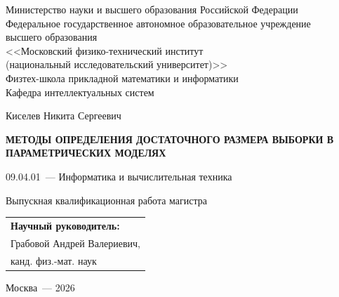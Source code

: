 \thispagestyle{empty}

\begin{titlepage}

\begin{center}
Министерство науки и высшего образования Российской Федерации\\
Федеральное государственное автономное образовательное учреждение\\ высшего образования\\
<<Московский физико-технический институт\\
(национальный исследовательский университет)>>\\
Физтех-школа прикладной математики и информатики\\
Кафедра интеллектуальных систем
\end{center}

\vspace{0pt plus5fill}

\begin{center}
Киселев Никита Сергеевич
\end{center}
\vspace{0pt}

\begin{center}
\textbf{МЕТОДЫ ОПРЕДЕЛЕНИЯ ДОСТАТОЧНОГО РАЗМЕРА ВЫБОРКИ В ПАРАМЕТРИЧЕСКИХ МОДЕЛЯХ}
\end{center}
\vspace{0pt}

\begin{center}
09.04.01~--- Информатика и вычислительная техника
\end{center}
\vspace{0pt}

\begin{center}
Выпускная квалификационная работа магистра
\end{center}
\vspace{0pt plus2fill}

\begin{flushleft}
\hfill\begin{tabular}{l}
\textbf{Научный руководитель:}\\
Грабовой Андрей Валериевич,\\
канд. физ.-мат. наук
\end{tabular}
\end{flushleft}

\vspace{0pt plus2fill}

\begin{center}
Москва~--- 2026
\end{center}

\end{titlepage}